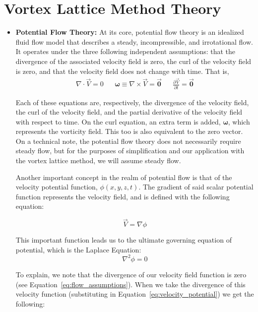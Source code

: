 \documentclass{article}
\begin{document}
\section{Vortex Lattice Method Theory}\label{sec:theory}
\begin{itemize}
\item[] \textbf{Potential Flow Theory:} At its core, potential flow theory is an idealized fluid flow model that describes a steady, incompressible, and irrotational flow. It operates under the three following independent assumptions: that the divergence of the associated velocity field is zero, the curl of the velocity field is zero, and that the velocity field does not change with time. That is,
\begin{align}\label{eq:flow_assumptions}
\nabla \cdot \vec{V} = 0 && \boldsymbol{\omega} \equiv \nabla \times \vec{V} = \boldsymbol{\vec{0}} && \frac{\partial \vec{V}}{\partial t} = \boldsymbol{\vec{0}}
\end{align} 

Each of these equations are, respectively, the divergence of the velocity field, the curl of the velocity field, and the partial derivative of the velocity field with respect to time. On the curl equation, an extra term is added, $\boldsymbol{\omega}$, which represents the vorticity field. This too is also equivalent to the zero vector. On a technical note, the potential flow theory does not necessarily require steady flow, but for the purposes of simplification and our application with the vortex lattice method, we will assume steady flow.

Another important concept in the realm of potential flow is that of the velocity potential function, $\phi(x,y,z,t)$. The gradient of said scalar potential function represents the velocity field, and is defined with the following equation:

\begin{equation}\label{eq:velocity_potential}
\vec{V} = \nabla \phi
\end{equation}

This important function leads us to the ultimate governing equation of potential, which is the Laplace Equation:
\begin{equation}\label{eq:laplace}
\nabla^2 \phi = 0
\end{equation}

To explain, we note that the divergence of our velocity field function is zero (see Equation~\ref{eq:flow_assumptions}). When we take the divergence of this velocity function (substituting in Equation~\ref{eq:velocity_potential}) we get the following:


\end{itemize}
\end{document}
